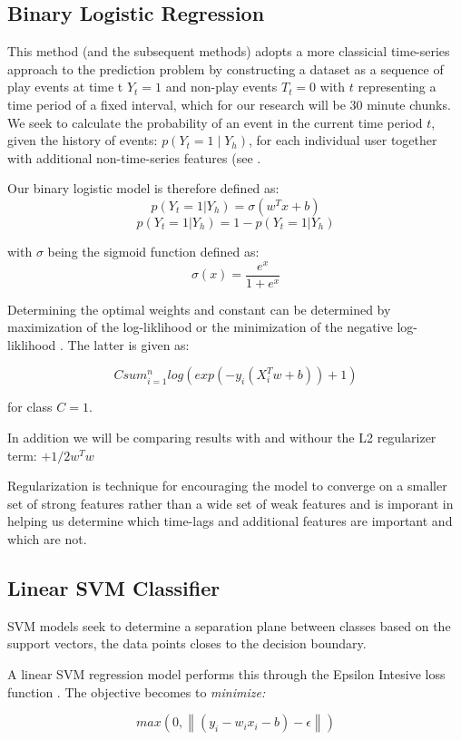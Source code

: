 \subsection{Binary Logistic Regression}

This method (and the subsequent methods) adopts a more classicial time-series approach to the prediction problem by constructing a dataset as a sequence of play events at time t $Y_t = 1$ and non-play events $T_t = 0$ with $t$ representing a time period of a fixed interval, which for our research will be 30 minute chunks. We seek to calculate the probability of an event in the current time period $t$, given the history of events: $p(Y_t =1 \mid Y_h)$, for each individual user together with additional non-time-series features (see . 

Our binary logistic model is therefore defined as:
$$p(Y_t = 1|Y_h) = \sigma(w^Tx + b)$$
$$p(Y_t = 1|Y_h) = 1 - p(Y_t = 1|Y_h)$$

with $\sigma$ being the sigmoid function defined as:
$$\sigma(x)=\frac{e^x}{1+e^x}$$

Determining the optimal weights and constant can be determined by maximization of the log-liklihood or the minimization of the negative log-liklihood \parencite{NegLog}. The latter is given as:

$$Csum^n_{i=1}log(exp(-y_i(X^T_iw+b))+1)$$

for class $C = 1$.

In addition we will be comparing results with and withour the L2 regularizer term:
 $ + 1/2w^Tw$

Regularization is technique for encouraging the model to converge on a smaller set of strong features rather than a wide set of weak features and is imporant in helping us determine which time-lags and additional features are important and which are not.

\subsection{Linear SVM Classifier}

SVM models seek to determine a separation plane between classes based on the support vectors, the data points closes to the decision boundary.

A linear SVM regression model performs this through the Epsilon Intesive loss function \parencite{Vapnik}. The objective becomes to \textit{minimize:}

$$max(0,\left\| (y_i - w_i x_i - b) - \epsilon \right\|)$$

